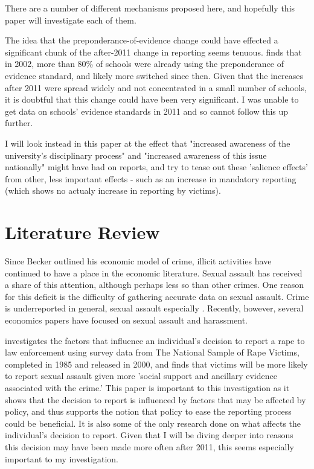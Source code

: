 \documentclass[AER,draftmode]{AEA}
\begin{document}
There are a number of different mechanisms proposed here, and hopefully this paper will investigate each of them.

The idea that the preponderance-of-evidence change could have effected a significant chunk of the after-2011 change in reporting seems tenuous.  finds that in 2002, more than 80\% of schools were already using the preponderance of evidence standard, and likely more switched since then. Given that the increases after 2011 were spread widely and not concentrated in a small number of schools, it is doubtful that this change could have been very significant. I was unable to get data on schools' evidence standards in 2011 and so cannot follow this up further. 

I will look instead in this paper at the effect that "increased awareness of the university's disciplinary process" and "increased awareness  of this issue nationally" might have had on reports, and try to tease out these 'salience effects' from other, less important effects - such as an increase in mandatory reporting (which shows no actualy increase in reporting by victims).

\section{Literature Review}
Since Becker outlined his economic model of crime, illicit activities have continued to have a place in the economic literature. Sexual assault has received a share of this attention, although perhaps less so than other crimes. One reason for this deficit is the difficulty of gathering accurate data on sexual assault. Crime is underreported in general, sexual assault especially \cite{kilpatrick_drug-facilitated_2007} \cite{fisher_sexual_2000}. Recently, however, several economics papers have focused on sexual assault and harassment. 

 investigates the factors that influence an individual's decision to report a rape to law enforcement using survey data from The National Sample of Rape Victims, completed in 1985 and released in 2000, and finds that victims will be more likely to report sexual assault given more 'social support and ancillary evidence associated with the crime.' This paper is important to this investigation as it shows that the decision to report is influenced by factors that may be affected by policy, and thus supports the notion that policy to ease the reporting process could be beneficial. It is also some of the only research done on what affects the individual's decision to report. Given that I will be diving deeper into reasons this decision may have been made more often after 2011, this seems especially important to my investigation.
\end{document}
